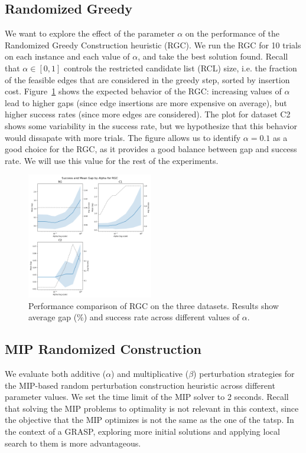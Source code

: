 \subsection{Randomized Greedy}
We want to explore the effect of the parameter $\alpha$ on the performance of the Randomized Greedy Construction heuristic (RGC).
We run the RGC for 10 trials on each instance and each value of $\alpha$, and take the best solution found.
Recall that $\alpha \in [0, 1]$ controls the restricted candidate list (RCL) size, i.e. the fraction of the feasible edges that are considered in the greedy step, sorted by insertion cost.
Figure~\ref{fig:alpha_vs_mean_gap_randomized_greedy} shows the expected behavior of the RGC:
increasing values of $\alpha$ lead to higher gaps (since edge insertions are more expensive on average), but higher success rates (since more edges are considered).
The plot for dataset C2 shows some variability in the success rate, but we hypothesize that this behavior would dissapate with more trials.
The figure allows us to identify $\alpha = 0.1$ as a good choice for the RGC, as it provides a good balance between gap and success rate.
We will use this value for the rest of the experiments.

\begin{figure}[h]
    \centering
    \includegraphics[width=0.49\textwidth]{figures/alpha_vs_mean_gap_randomized_greedy.png}
    \caption{Performance comparison of RGC on the three datasets. Results show average gap (\%) and success rate across different values of $\alpha$.}
    \label{fig:alpha_vs_mean_gap_randomized_greedy}
\end{figure}


\subsection{MIP Randomized Construction}

We evaluate both additive ($\alpha$) and multiplicative ($\beta$) perturbation strategies for the MIP-based random perturbation construction heuristic across different parameter values.
We set the time limit of the MIP solver to 2 seconds. Recall that solving the MIP problems to optimality is not relevant in this context, since the objective that the MIP optimizes is not
the same as the one of the \gls{tatsp}. In the context of a GRASP, exploring more initial solutions and applying local search to them is more advantageous.

